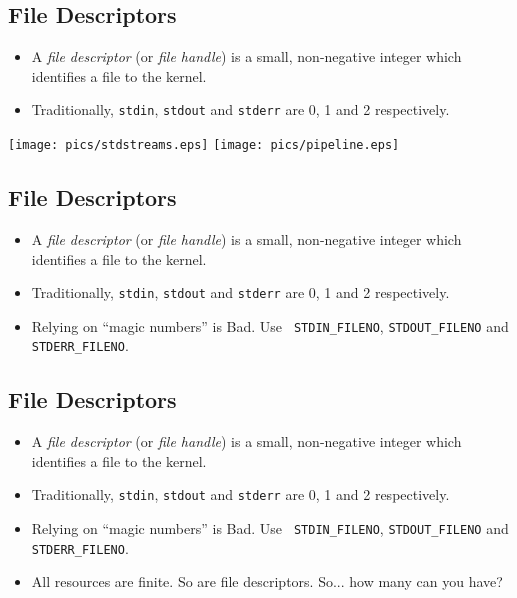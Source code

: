 \documentclass[xga]{xdvislides}
\begin{document}
\subsection{File Descriptors}
\begin{itemize}
	\item A {\em file descriptor} (or {\em file handle}) is a small,
		non-negative integer which identifies a file to the kernel.
	\item Traditionally, {\tt stdin}, {\tt stdout} and {\tt stderr}
		are 0, 1 and 2 respectively.
\end{itemize}
\texttt{[image: pics/stdstreams.eps]}
\texttt{[image: pics/pipeline.eps]}



\subsection{File Descriptors}
\begin{itemize}
	\item A {\em file descriptor} (or {\em file handle}) is a small,
		non-negative integer which identifies a file to the kernel.
	\item Traditionally, {\tt stdin}, {\tt stdout} and {\tt stderr}
		are 0, 1 and 2 respectively.
	\item Relying on ``magic numbers'' is Bad\texttrademark.  Use {\tt
		STDIN\_FILENO}, {\tt STDOUT\_FILENO} and {\tt STDERR\_FILENO}.
\end{itemize}

\subsection{File Descriptors}
\begin{itemize}
	\item A {\em file descriptor} (or {\em file handle}) is a small,
		non-negative integer which identifies a file to the kernel.
	\item Traditionally, {\tt stdin}, {\tt stdout} and {\tt stderr}
		are 0, 1 and 2 respectively.
	\item Relying on ``magic numbers'' is Bad\texttrademark.  Use {\tt
		STDIN\_FILENO}, {\tt STDOUT\_FILENO} and {\tt STDERR\_FILENO}.
	\item All resources are finite.  So are file descriptors.  So... how many can you have?
\end{itemize}
\end{document}
